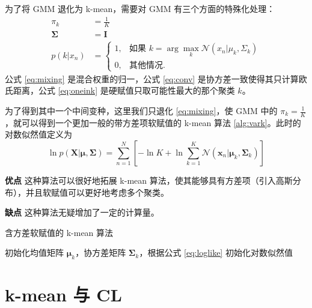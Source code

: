     \begin{solution}
        为了将 GMM 退化为 k-mean，需要对 GMM 有三个方面的特殊化处理：
        \begin{align}
            \pi_k &= \frac{1}{K} \label{eq:mixing}\\
            \bm{\Sigma} &= \bm{I} \label{eq:conv} \\
            p(k|x_n) &= \begin{cases}
                1, & \text{如果 }k=\arg\max_k\mathcal{N}(x_n|\mu_k,\Sigma_k) \\
                0, & \text{其他情况.}
            \end{cases} \label{eq:oneink}
        \end{align}
        公式 \eqref{eq:mixing} 是混合权重的归一，公式 \eqref{eq:conv} 是协方差一致使得其只计算欧氏距离，公式 \eqref{eq:oneink} 是硬赋值只取可能性最大的那个聚类 $k$。

        为了得到其中一个中间变种，这里我们只退化 \eqref{eq:mixing}，使 GMM 中的 $\pi_k=\frac{1}{K}$，就可以得到一个更加一般的带方差项软赋值的 k-mean 算法 \ref{alg:vark}。此时的对数似然值定义为
        \begin{equation}\label{eq:loglike}
            \ln p(\bm{X}|\bm{\mu},\bm{\Sigma})=\sum_{n=1}^N\left[-\ln K + \ln\sum_{k=1}^K\mathcal{N}(\bm{x}_n|\bm{\mu}_k,\bm{\Sigma}_k)\right]
        \end{equation}

        \textbf{优点} 这种算法可以很好地拓展 k-mean 算法，使其能够具有方差项（引入高斯分布），并且软赋值可以更好地考虑多个聚类。
        
        \textbf{缺点} 这种算法无疑增加了一定的计算量。
    \end{solution}

    \begin{algorithm}
        \caption{含方差软赋值的 k-mean 算法}\label{alg:vark}
        \BlankLine
        初始化均值矩阵 $\bm{\mu}_k$，协方差矩阵 $\bm{\Sigma}_k$，根据公式 \eqref{eq:loglike} 初始化对数似然值\;
    \end{algorithm}

    \section{k-mean 与 CL}
